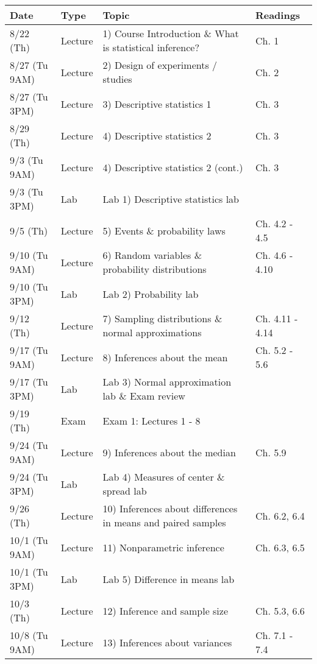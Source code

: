 \documentclass{article}
\begin{document}
\begin{center}
	\begin{tabular}{|p{2.5cm}|p{1.5cm}|p{9cm}|p{2.8cm}|}
		\hline
		Date & Type & Topic & Readings \\ \hline \hline
		8/22 (Th) & Lecture & 1) Course Introduction \& What is statistical inference? & Ch. 1 \\ \hline
		8/27 (Tu 9AM) & Lecture & 2) Design of experiments / studies & Ch. 2 \\ \hline
		8/27 (Tu 3PM) & Lecture & 3) Descriptive statistics 1 & Ch. 3 \\ \hline
		8/29 (Th) & Lecture & 4) Descriptive statistics 2 & Ch. 3 \\ \hline
		9/3 (Tu 9AM) & Lecture & 4) Descriptive statistics 2 (cont.) & Ch. 3 \\ \hline
		9/3 (Tu 3PM) & Lab & Lab 1) Descriptive statistics lab & \\ \hline
		9/5 (Th) & Lecture & 5) Events \& probability laws & Ch. 4.2 - 4.5 \\ \hline
		9/10 (Tu 9AM) & Lecture & 6) Random variables \& probability distributions & Ch. 4.6 - 4.10 \\ \hline
		9/10 (Tu 3PM) & Lab & Lab 2) Probability lab & \\ \hline
		9/12 (Th) & Lecture &  7) Sampling distributions \& normal approximations & Ch. 4.11 - 4.14 \\ \hline
		9/17 (Tu 9AM) & Lecture & 8) Inferences about the mean & Ch. 5.2 - 5.6 \\ \hline
		9/17 (Tu 3PM) & Lab & Lab 3) Normal approximation lab \& Exam review & \\ \hline
		9/19 (Th) & Exam & Exam 1: Lectures 1 - 8 & \\ \hline
		9/24 (Tu 9AM) & Lecture & 9) Inferences about the median & Ch. 5.9 \\ \hline
		9/24 (Tu 3PM) & Lab & Lab 4) Measures of center \& spread lab  & \\ \hline
		9/26 (Th) & Lecture & 10) Inferences about differences in means and paired samples & Ch. 6.2, 6.4 \\ \hline
		10/1 (Tu 9AM) & Lecture &  11) Nonparametric inference & Ch. 6.3, 6.5 \\ \hline
		10/1 (Tu 3PM) & Lab & Lab 5) Difference in means lab & \\ \hline 
		10/3 (Th) & Lecture & 12) Inference and sample size & Ch. 5.3, 6.6 \\ \hline
		10/8 (Tu 9AM) & Lecture & 13) Inferences about variances & Ch. 7.1 - 7.4 \\ \hline

\end{tabular}
\end{center}
\end{document}
